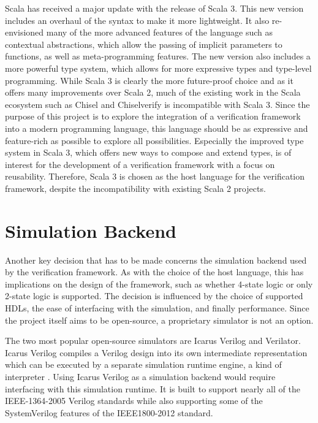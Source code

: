Scala has received a major update with the release of Scala 3. This new version includes an overhaul of the syntax to
make it more lightweight. It also re-envisioned many of the more advanced features of the language such as contextual
abstractions, which allow the passing of implicit parameters to functions, as well as meta-programming features. The
new version also includes a more powerful type system, which allows for more expressive types and type-level
programming. While Scala 3 is clearly the more future-proof choice and as it offers many improvements over Scala 2, much of
the existing work in the Scala ecosystem such as Chisel and Chiselverify is incompatible with Scala 3. Since the
purpose of this project is to explore the integration of a verification framework into a modern programming language,
this language should be as expressive and feature-rich as possible to explore all possibilities. Especially
the improved type system in Scala 3, which offers new ways to compose and extend types, is of interest for the
development of a verification framework with a focus on reusability. Therefore, Scala 3 is chosen as the host
language for the verification framework, despite the incompatibility with existing Scala 2 projects.

\section{Simulation Backend} %

Another key decision that has to be made concerns the simulation backend used by the verification framework.
As with the choice of the host language, this has implications on the design of the framework, such as whether 4-state logic
or only 2-state logic is supported.
The decision is influenced by the choice of supported HDLs, the ease of interfacing with the simulation, and
finally performance. Since the project itself aims to be open-source, a proprietary simulator
is not an option.

The two most popular open-source simulators are Icarus Verilog and Verilator. Icarus Verilog
compiles a Verilog design into its own intermediate representation which can be executed by a separate simulation
runtime engine, a kind of interpreter \cite{iverilog}. Using Icarus Verilog as a simulation backend would require
interfacing with this simulation runtime. It is built to support nearly all of the IEEE-1364-2005 Verilog standards
while also supporting some of the SystemVerilog features of the IEEE1800-2012 standard.

